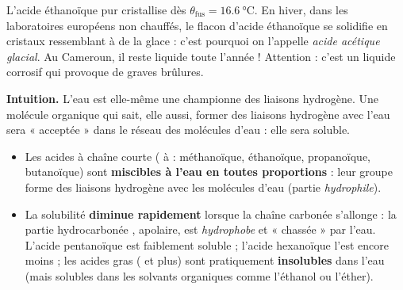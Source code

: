 \documentclass[11pt]{article}
\newcounter{popsec}
\newcounter{popsub}
\newcommand{\courssub}[1]{%
  \stepcounter{popsub}%
  \par\vspace{9pt}\noindent{\popxbold\fontsize{11.5}{13}\selectfont\color{popink}{\color{poporange}\thepopsec.\thepopsub}\hspace{6pt}#1}\par\nopagebreak\vspace{4pt}
}
\begin{document}
\begin{savaistu}
L'acide éthanoïque pur cristallise dès $\theta_{\text{fus}} = \SI{16,6}{\celsius}$. En hiver, dans les laboratoires européens non chauffés, le flacon d'acide éthanoïque se solidifie en cristaux ressemblant à de la glace : c'est pourquoi on l'appelle \emph{acide acétique glacial}. Au Cameroun, il reste liquide toute l'année ! Attention : c'est un liquide corrosif qui provoque de graves brûlures.
\end{savaistu}

\courssub{Solubilité dans l'eau}

\textbf{Intuition.} L'eau est elle-même une championne des liaisons hydrogène. Une molécule organique qui sait, elle aussi, former des liaisons hydrogène avec l'eau sera « acceptée » dans le réseau des molécules d'eau : elle sera soluble.

\begin{propriete}
\begin{itemize}
\item Les acides à chaîne courte ( à  : méthanoïque, éthanoïque, propanoïque, butanoïque) sont \textbf{miscibles à l'eau en toutes proportions} : leur groupe  forme des liaisons hydrogène avec les molécules d'eau (partie \emph{hydrophile}).
\item La solubilité \textbf{diminue rapidement} lorsque la chaîne carbonée s'allonge : la partie hydrocarbonée , apolaire, est \emph{hydrophobe} et « chassée » par l'eau. L'acide pentanoïque est faiblement soluble ; l'acide hexanoïque l'est encore moins ; les acides gras ( et plus) sont pratiquement \textbf{insolubles} dans l'eau (mais solubles dans les solvants organiques comme l'éthanol ou l'éther).
\end{itemize}
\end{propriete}
\end{document}
